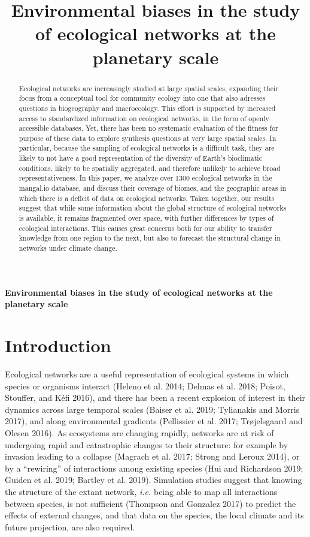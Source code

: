 \documentclass[11pt]{article}
\title{Environmental biases in the study of ecological networks at the
planetary scale}
\begin{document}
{\bfseries\Large Environmental biases in the study of ecological networks at the
planetary scale}

\begin{abstract}
Ecological networks are increasingly studied at large spatial scales,
expanding their focus from a conceptual tool for community ecology into
one that also adresses questions in biogeography and macroecology. This
effort is supported by increased access to standardized information on
ecological networks, in the form of openly accessible databases. Yet,
there has been no systematic evaluation of the fitness for purpose of
these data to explore synthesis questions at very large spatial scales.
In particular, because the sampling of ecological networks is a
difficult task, they are likely to not have a good representation of the
diversity of Earth's bioclimatic conditions, likely to be spatially
aggregated, and therefore unlikely to achieve broad representativeness.
In this paper, we analyze over 1300 ecological networks in the mangal.io
database, and discuss their coverage of biomes, and the geographic areas
in which there is a deficit of data on ecological networks. Taken
together, our results suggest that while some information about the
global structure of ecological networks is available, it remains
fragmented over space, with further differences by types of ecological
interactions. This causes great concerns both for our ability to
transfer knowledge from one region to the next, but also to forecast the
structural change in networks under climate change.
\end{abstract}

\setpagewiselinenumbers
\modulolinenumbers[2]
\linenumbers
\doublespace

\hypertarget{introduction}{%
\section{Introduction}\label{introduction}}

Ecological networks are a useful representation of ecological systems in
which species or organisms interact (Heleno et al. 2014; Delmas et al.
2018; Poisot, Stouffer, and Kéfi 2016), and there has been a recent
explosion of interest in their dynamics across large temporal scales
(Baiser et al. 2019; Tylianakis and Morris 2017), and along
environmental gradients (Pellissier et al. 2017; Trøjelsgaard and Olesen
2016). As ecosystems are changing rapidly, networks are at risk of
undergoing rapid and catastrophic changes to their structure: for
example by invasion leading to a collapse (Magrach et al. 2017; Strong
and Leroux 2014), or by a ``rewiring'' of interactions among existing
species (Hui and Richardson 2019; Guiden et al. 2019; Bartley et al.
2019). Simulation studies suggest that knowing the structure of the
extant network, \emph{i.e.} being able to map all interactions between
species, is not sufficient (Thompson and Gonzalez 2017) to predict the
effects of external changes, and that data on the species, the local
climate and its future projection, are also required.
\end{document}
